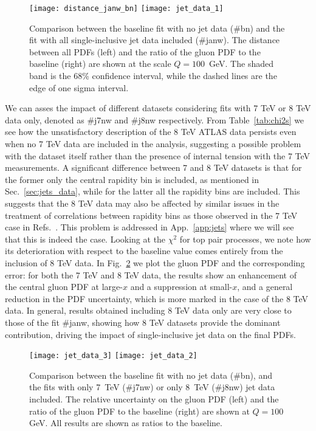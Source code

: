 \begin{figure}[!t]
    \centering
    \texttt{[image: distance\_janw\_bn]}
    \texttt{[image: jet\_data\_1]}\\
    \caption{ Comparison between the baseline fit with no jet data  (\#bn)
      and the fit with all single-inclusive jet data included (\#janw).
      The distance between all PDFs
      (left) and the ratio of the gluon PDF to the baseline (right) are shown at the scale
      $Q=100$~GeV. The shaded band is the 68\% confidence interval,
      while the dashed lines are the edge of one sigma interval.}
    \label{fig:jet_data_total}
\end{figure}

%
We can asses the impact of different datasets considering fits with 7 TeV or 8 TeV data only, denoted as \#j7nw and \#j8nw
respectively. From Table~\ref{tab:chi2s} we see how the unsatisfactory description of the 8 TeV ATLAS data persists even when 
no 7 TeV data are included in the analysis, suggesting a possible problem with the dataset itself rather than 
the presence of internal tension with the 7 TeV measurements.
A significant difference between 7 and 8 TeV datasets is that for the former only the central rapidity bin is included,
as mentioned in Sec.~\ref{sec:jets_data}, while for the latter all the rapidity bins are included.
This suggests that the 8 TeV data may also be affected by similar issues in the treatment of correlations 
between rapidity bins as those observed in the 7 TeV case in Refs.~\cite{Ball:2017nwa}. This problem is addressed
in App.~\ref{app:jets} where we will see that this is indeed the case.
%
Looking at the $\chi^2$ for top pair processes, we note how its deterioration with respect to the baseline value comes
entirely from the inclusion of 8 TeV data.
In Fig.~\ref{fig:jet_data_partial}
we plot the gluon PDF and the corresponding error: for both the 7 TeV and 8 TeV data, the results show 
an enhancement of the central gluon PDF at large-$x$ and a suppression at small-$x$, and a general reduction in the 
PDF uncertainty, which is more marked in the case of the 8 TeV data. 
In general, results obtained including 8 TeV data only are very close to those of the fit \#janw, showing
how 8 TeV datasets provide the dominant contribution, driving the impact of single-inclusive jet data on the final PDFs.

\begin{figure}[!t]
    \centering
    \texttt{[image: jet\_data\_3]}
    \texttt{[image: jet\_data\_2]}
    \caption{ Comparison between the baseline fit with no jet data
      (\#bn), and the fits with only 7~TeV (\#j7nw) or only 8~TeV (\#j8nw)
      jet data included. The relative uncertainty on the gluon PDF (left)
      and the ratio of the gluon PDF to the baseline (right) are shown at
      $Q=100$ GeV. All results are shown as ratios to the baseline.}
    \label{fig:jet_data_partial}
\end{figure}

